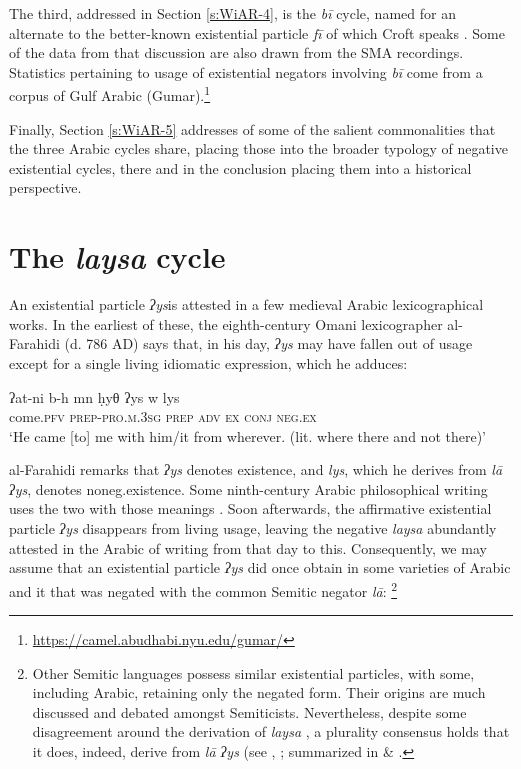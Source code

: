 \documentclass[output=paper]{langsci/langscibook}
\begin{document}
The third, addressed in Section \ref{s:WiAR-4}, is the \textit{bī} cycle, named for an alternate to the better-known existential particle \textit{fī} of which Croft speaks \citeyearpar[7]{Croft1991}. Some of the data from that discussion are also drawn from the SMA recordings. Statistics pertaining to usage of existential negators involving \textit{bī} come from a corpus of Gulf Arabic (Gumar).\footnote{\url{https://camel.abudhabi.nyu.edu/gumar/}}

Finally, Section \ref{s:WiAR-5} addresses of some of the salient commonalities that the three Arabic cycles share, placing those into the broader typology of negative existential cycles, there and in the conclusion placing them into a historical perspective.

\section{The \textit{laysa} cycle}\label{s:WiAR-2}


An existential particle \textit{ʔys}\footnotemark is attested in a few medieval Arabic lexicographical works. In the earliest of these, the eighth-century Omani lexicographer al-Farahidi (d. 786 AD) says that, in his day, \textit{ʔys} may have fallen out of usage except for a single living idiomatic expression, which he adduces:

\ea \label{ex:WiAR-1}
	\gll ʔat-ni b-h mn ḥyθ ʔys w lys \\
	come.\textsc{pfv} \textsc{prep-pro.m.3sg} \textsc{prep} \textsc{adv} \textsc{ex} \textsc{conj} \textsc{neg.ex}\\
	\glt `He came [to] me with him/it from wherever. (lit. where there and not there)' \citep[105]{al-far2003a}
\z

al-Farahidi remarks that \textit{ʔys} denotes existence, and \textit{lys}, which he derives from \textit{lā ʔys}, denotes noneg.existence. Some ninth-century Arabic philosophical writing uses the two with those meanings \citep[35]{gihami-a}. Soon afterwards, the affirmative existential particle \textit{ʔys} disappears from living usage, leaving the negative \textit{laysa} abundantly attested in the Arabic of writing from that day to this. Consequently, we may assume that an existential particle \textit{ʔys} did once obtain in some varieties of Arabic and it that was negated with the common Semitic negator \textit{lā}: \footnote{Other Semitic languages possess similar existential particles, with some, including Arabic, retaining only the negated form. Their origins are much discussed and debated amongst Semiticists. Nevertheless, despite some disagreement around the derivation of \textit{laysa} \citep{wilmsen2016a, al-jallad2018a}, a plurality consensus holds that it does, indeed, derive from \textit{lā ʔys} (see \citet{blau1972a, gensler2000a}, \citet[464-465, 488-489]{lipi2001a}; \cite{macelaru2003} summarized in \citet[329-331]{wilmsen2016a} \& \citet[298-299]{wilmsen2017a}.}
\end{document}
